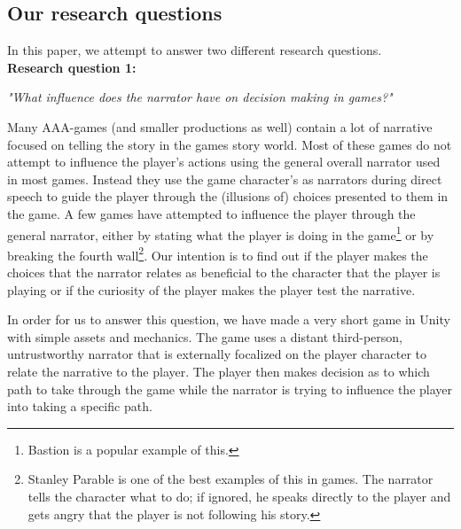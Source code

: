\subsection{Our research questions}
\label{Method_Research}

In this paper, we attempt to answer two different research questions.\\

\textbf{Research question 1:}
\begin{center}
\textit{"What influence does the narrator have on decision making in games?"}
\end{center}
Many AAA-games (and smaller productions as well) contain a lot of narrative focused on telling the story in the games story world. Most of these games do not attempt to influence the player's actions using the general overall narrator used in most games. Instead they use the game character's as narrators during direct speech to guide the player through the (illusions of) choices presented to them in the game. A few games have attempted to influence the player through the general narrator, either by stating what the player is doing in the game\footnote{Bastion is a popular example of this.} or by breaking the fourth wall\footnote{Stanley Parable is one of the best examples of this in games. The narrator tells the character what to do; if ignored, he speaks directly to the player and gets angry that the player is not following his story.}. Our intention is to find out if the player makes the choices that the narrator relates as beneficial to the character that the player is playing or if the curiosity of the player makes the player test the narrative.

In order for us to answer this question, we have made a very short game in Unity with simple assets and mechanics. The game uses a distant third-person, untrustworthy narrator that is externally focalized on the player character to relate the narrative to the player. The player then makes decision as to which path to take through the game while the narrator is trying to influence the player into taking a specific path.

